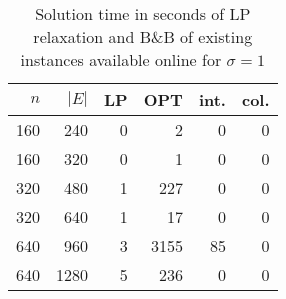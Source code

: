 \begin{table}[]
	\centering
\begin{tabular}{rrrrrr}
$n$ & $|E|$ & LP  & OPT &  int. & col.\\
\hline
 160 & 240  & 0    &  2   &   0   &   0  \\
 160 & 320  & 0    &  1   &   0   &   0  \\
 320 & 480  & 1    &227   &   0   &   0  \\
 320 & 640  & 1    & 17   &   0   &   0  \\
 640 & 960  & 3    &3155  &  85   &   0  \\
 640 &1280  & 5    &236   &   0   &   0  
\end{tabular}
\caption{Solution time in seconds of LP relaxation and B\&B of existing instances available online for $\sigma=1$}
\label{tab:soltime-exist}
\end{table}

